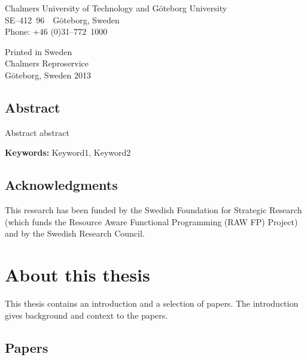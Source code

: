 \documentclass[a4paper]{book}
\newcommand{\uni}{Chalmers University of Technology and G\"oteborg University}
\begin{document}
\vspace{1cm} 

\noindent \uni \\
\noindent SE--412~96~~G\"oteborg, Sweden\\
\noindent Phone: +46 (0)31--772~1000 \\

\vspace{1cm} 

\noindent Printed in Sweden\\
\noindent Chalmers Reproservice\\
\noindent G\"oteborg, Sweden 2013


\thispagestyle{empty}

\clearpage
{}

\section*{Abstract}
Abstract abstract 

\vspace{5mm}

\noindent

 \textbf{Keywords:} Keyword1, Keyword2  

\clearpage

\section*{Acknowledgments}


\vspace{5mm}
This research has been funded by the Swedish Foundation for
Strategic Research (which funds the Resource Aware Functional 
Programming (RAW FP) Project) and by the Swedish Research Council.


\tableofcontents


\cleardoublepage
\clearpage

\pagestyle{fancy}
\fancyfoot{}
\fancyhead[LO]{}
\fancyhead[RO]{\leftmark}
\renewcommand{\headrulewidth}{0.0pt}
\fancyhead[LE,RO]{\thepage}

\chapter{About this thesis} 

This thesis contains an introduction and a selection of papers. The introduction 
gives background and context to the papers. 

\section{Papers} 
\end{document}
